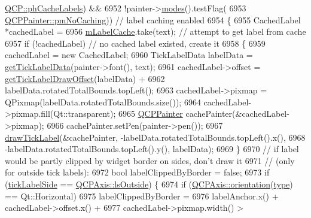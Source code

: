 \begin{DoxyCode}
      \hyperlink{namespace_q_c_p_a5400e5fcb9528d92002ddb938c1f4ef4a8e9cfe5ee0c5cd36dd7accf9739aff65}{QCP::phCacheLabels}) &&
6952       !painter->\hyperlink{class_q_c_p_painter_a99b89eaf5363faaa1e1e6162856f436c}{modes}().testFlag(
6953           \hyperlink{class_q_c_p_painter_a156cf16444ff5e0d81a73c615fdb156dae78f9a4eb277a5f9207f50850a51a0b0}{QCPPainter::pmNoCaching})) \textcolor{comment}{// label caching enabled}
6954   \{
6955     CachedLabel *cachedLabel =
6956         \hyperlink{class_q_c_p_axis_painter_private_a07ac270ea0c0ae084debd48d6a740e35}{mLabelCache}.take(text); \textcolor{comment}{// attempt to get label from cache}
6957     \textcolor{keywordflow}{if} (!cachedLabel)           \textcolor{comment}{// no cached label existed, create it}
6958     \{
6959       cachedLabel = \textcolor{keyword}{new} CachedLabel;
6960       TickLabelData labelData = \hyperlink{class_q_c_p_axis_painter_private_ad9f24fbcbf9d8c92b34d9d00b010e6a3}{getTickLabelData}(painter->font(), text);
6961       cachedLabel->offset = \hyperlink{class_q_c_p_axis_painter_private_a6b02e6fd70cc65f726ca8cb3e6f16de4}{getTickLabelDrawOffset}(labelData) +
6962                             labelData.rotatedTotalBounds.topLeft();
6963       cachedLabel->pixmap = QPixmap(labelData.rotatedTotalBounds.size());
6964       cachedLabel->pixmap.fill(Qt::transparent);
6965       \hyperlink{class_q_c_p_painter}{QCPPainter} cachePainter(&cachedLabel->pixmap);
6966       cachePainter.setPen(painter->pen());
6967       \hyperlink{class_q_c_p_axis_painter_private_ad8f2f12cd35b8189e8bf96679e873933}{drawTickLabel}(&cachePainter, -labelData.rotatedTotalBounds.topLeft().x(),
6968                     -labelData.rotatedTotalBounds.topLeft().y(), labelData);
6969     \}
6970     \textcolor{comment}{// if label would be partly clipped by widget border on sides, don't draw it}
6971     \textcolor{comment}{// (only for outside tick labels):}
6972     \textcolor{keywordtype}{bool} labelClippedByBorder = \textcolor{keyword}{false};
6973     \textcolor{keywordflow}{if} (\hyperlink{class_q_c_p_axis_painter_private_a9d27f7625fcfbeb3a60193d0c18fc7e9}{tickLabelSide} == \hyperlink{class_q_c_p_axis_a24b13374b9b8f75f47eed2ea78c37db9a2eadb509fc0c9a8b35b85c86ec9f3c7a}{QCPAxis::lsOutside}) \{
6974       \textcolor{keywordflow}{if} (\hyperlink{class_q_c_p_axis_a57483f2f60145ddc9e63f3af53959265}{QCPAxis::orientation}(\hyperlink{class_q_c_p_axis_painter_private_ae04594e97417336933d807c86d353098}{type}) == Qt::Horizontal)
6975         labelClippedByBorder =
6976             labelAnchor.x() + cachedLabel->offset.x() +
6977                     cachedLabel->pixmap.width() >

\end{DoxyCode}
